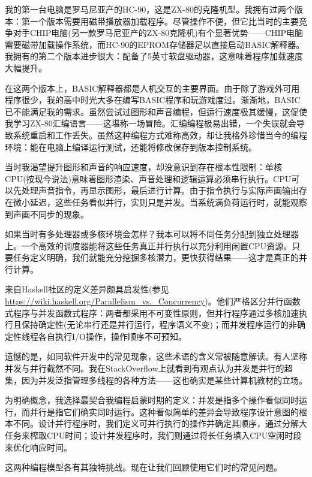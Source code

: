 我的第一台电脑是罗马尼亚产的HC-90，这是ZX-80的克隆机型。我拥有过两个版本：第一个版本需要用磁带播放器加载程序。尽管操作不便，但它比当时的主要竞争对手CHIP电脑(另一款罗马尼亚产的ZX-80克隆机)有个显著优势——CHIP电脑需要磁带加载操作系统，而HC-90的EPROM存储器足以直接启动BASIC解释器。我拥有的第二个版本进步很大：配备了5英寸软盘驱动器，这意味着程序加载速度大幅提升。

在这两个版本上，BASIC解释器都是人机交互的主要界面。由于除了游戏外可用程序很少，我的高中时光大多在编写BASIC程序和玩游戏度过。渐渐地，BASIC已不能满足我的需求。虽然尝试过图形和声音编程，但运行速度极其缓慢，这促使我学习ZX-80汇编语言——这堪称一场冒险。汇编编程极易出错，一个失误就会导致系统重启和工作丢失。虽然这种编程方式难称高效，却让我格外珍惜当今的编程环境：能在电脑上编译运行测试，还能将修改保存到版本控制系统。

当时我渴望提升图形和声音的响应速度，却没意识到存在根本性限制：单核CPU(按现今说法)意味着图形渲染、声音处理和逻辑运算必须串行执行。CPU可以先处理声音指令，再显示图形，最后进行计算。由于指令执行与实际声画输出存在微小延迟，这些任务看似并行，实则只是并发。当系统满负荷运行时，就能观察到声画不同步的现象。

如果当时有多处理器或多核环境会怎样？我本可以将不同任务分配到独立处理器上。一个高效的调度器能将这些任务真正并行执行以充分利用闲置CPU资源。只要任务定义明确，我们就能充分挖掘多核潜力，更快获得结果——这才是真正的并行计算。

来自Haskell社区的定义差异颇具启发性(参见\url{https://wiki.haskell.org/Parallelism_vs._Concurrency})。他们严格区分并行函数式程序与并发函数式程序：两者都采用不可变性原则，但并行程序通过多核加速执行且保持确定性(无论串行还是并行运行，程序语义不变)；而并发程序运行的非确定性线程各自执行I/O操作，操作顺序不可预知。

遗憾的是，如同软件开发中的常见现象，这些术语的含义常被随意解读。有人坚称并发与并行截然不同。我在StackOverflow上就看到有观点认为并发是并行的超集，因为并发泛指管理多线程的各种方法——这也确实是某些计算机教材的立场。

为明确概念，我选择最契合我编程启蒙时期的定义：并发是指多个操作看似同时运行，而并行是指它们确实同时运行。这种看似简单的差异会导致程序设计意图的根本不同。设计并行程序时，我们定义可并行执行的操作并确定其顺序，通过分解大任务来榨取CPU时间；设计并发程序时，我们则通过将长任务填入CPU空闲时段来优化响应时间。

这两种编程模型各有其独特挑战。现在让我们回顾使用它们时的常见问题。